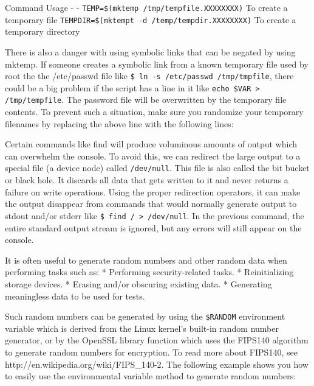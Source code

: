 Command \textbar{} Usage - \textbar{} -
\texttt{TEMP=\$(mktemp /tmp/tempfile.XXXXXXXX)} \textbar{} To create a
temporary file \texttt{TEMPDIR=\$(mktempt -d /temp/tempdir.XXXXXXXX)}
\textbar{} To create a temporary directory

There is also a danger with using symbolic links that can be negated by
using mktemp. If someone creates a symbolic link from a known temporary
file used by root the the /etc/passwd file like
\texttt{\$ ln -s /etc/passwd /tmp/tmpfile}, there could be a big problem
if the script has a line in it like
\texttt{echo \$VAR \textgreater{} /tmp/tempfile}. The password file will
be overwritten by the temporary file contents. To prevent such a
situation, make sure you randomize your temporary filenames by replacing
the above line with the following lines:

\begin{Shaded}
\begin{Highlighting}[]
 \OtherTok{)}
  \KeywordTok{>} 
\end{Highlighting}
\end{Shaded}

Certain commands like find will produce voluminous amounts of output
which can overwhelm the console. To avoid this, we can redirect the
large output to a special file (a device node) called
\texttt{/dev/null}. This file is also called the bit bucket or black
hole. It discards all data that gets written to it and never returns a
failure on write operations. Using the proper redirection operators, it
can make the output disappear from commands that would normally generate
output to stdout and/or stderr like
\texttt{\$ find / \textgreater{} /dev/null}. In the previous command,
the entire standard output stream is ignored, but any errors will still
appear on the console.

It is often useful to generate random numbers and other random data when
performing tasks such as: * Performing security-related tasks. *
Reinitializing storage devices. * Erasing and/or obscuring existing
data. * Generating meaningless data to be used for tests.

Such random numbers can be generated by using the \texttt{\$RANDOM}
environment variable which is derived from the Linux kernel's built-in
random number generator, or by the OpenSSL library function which uses
the FIPS140 algorithm to generate random numbers for encryption. To read
more about FIPS140, see http://en.wikipedia.org/wiki/FIPS\_140-2. The
following example shows you how to easily use the environmental variable
method to generate random numbers:

